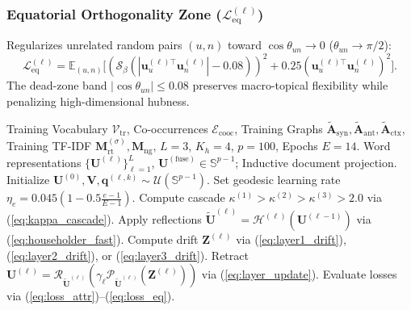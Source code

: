 \documentclass[journal]{IEEEtran}
\begin{document}
\subsubsection{Equatorial Orthogonality Zone ($\mathcal{L}_{\text{eq}}^{(\ell)}$)}
Regularizes unrelated random pairs $(u, n)$ toward $\cos\theta_{un} \to 0$ ($\theta_{un} \to \pi/2$):
\begin{equation}
\mathcal{L}_{\text{eq}}^{(\ell)} = \mathbb{E}_{(u,n)}\Big[ \left(\mathcal{S}_\beta(|\mathbf{u}_u^{(\ell)\top}\mathbf{u}_n^{(\ell)}| - 0.08)\right)^2 + 0.25(\mathbf{u}_u^{(\ell)\top}\mathbf{u}_n^{(\ell)})^2 \Big].
\label{eq:loss_eq}
\end{equation}
The dead-zone band $|\cos\theta_{un}| \le 0.08$ preserves macro-topical flexibility while penalizing high-dimensional hubness.

\begin{algorithm}[!t]
\caption{POLARIS Inductive Representation Learning}
\label{alg:polaris}
\footnotesize
\begin{algorithmic}[1]
\Require Training Vocabulary $\mathcal{V}_{\text{tr}}$, Co-occurrences $\mathcal{E}_{\text{cooc}}$, Training Graphs $\tilde{\mathbf{A}}_{\text{syn}}, \tilde{\mathbf{A}}_{\text{ant}}, \tilde{\mathbf{A}}_{\text{ctx}}$, Training TF-IDF $\mathbf{M}_{\text{rt}}^{(\sigma)}, \mathbf{M}_{\text{ng}}$, $L=3$, $K_h=4$, $p=100$, Epochs $E=14$.
\Ensure Word representations $\{\mathbf{U}^{(\ell)}\}_{\ell=1}^L$, $\mathbf{U}^{(\text{fuse})} \in \mathbb{S}^{p-1}$; Inductive document projection.
\State Initialize $\mathbf{U}^{(0)}, \mathbf{V}, \mathbf{q}^{(\ell,k)} \sim \mathcal{U}(\mathbb{S}^{p-1})$.
    \State Set geodesic learning rate $\eta_e = 0.045 (1 - 0.5\frac{e-1}{E-1})$.
        \State Compute cascade $\kappa^{(1)} > \kappa^{(2)} > \kappa^{(3)} > 2.0$ via (\ref{eq:kappa_cascade}).
            \State Apply reflections $\tilde{\mathbf{U}}^{(\ell)} = \mathcal{H}^{(\ell)}(\mathbf{U}^{(\ell-1)})$ via (\ref{eq:householder_fast}).
            \State Compute drift $\mathbf{Z}^{(\ell)}$ via (\ref{eq:layer1_drift}), (\ref{eq:layer2_drift}), or (\ref{eq:layer3_drift}).
            \State Retract $\mathbf{U}^{(\ell)} = \mathcal{R}_{\tilde{\mathbf{U}}^{(\ell)}}(\gamma_\ell \mathcal{P}_{\tilde{\mathbf{U}}^{(\ell)}}(\mathbf{Z}^{(\ell)}))$ via (\ref{eq:layer_update}).
            \State Evaluate losses via (\ref{eq:loss_attr})--(\ref{eq:loss_eq}).
        \EndFor

\end{algorithmic}
\end{algorithm}
\end{document}
